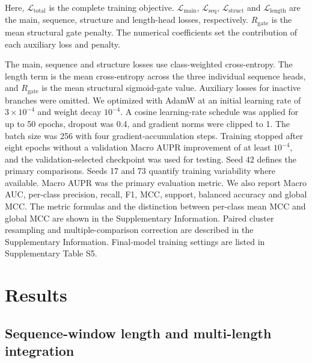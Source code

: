 \documentclass[unnumsec,webpdf,contemporary,large]{oup-authoring-template}
\begin{document}
Here, $\mathcal{L}_{\mathrm{total}}$ is the complete training objective. $\mathcal{L}_{\mathrm{main}}$, $\mathcal{L}_{\mathrm{seq}}$, $\mathcal{L}_{\mathrm{struct}}$ and $\mathcal{L}_{\mathrm{length}}$ are the main, sequence, structure and length-head losses, respectively. $R_{\mathrm{gate}}$ is the mean structural gate penalty. The numerical coefficients set the contribution of each auxiliary loss and penalty.

The main, sequence and structure losses use class-weighted cross-entropy. The length term is the mean cross-entropy across the three individual sequence heads, and $R_{\mathrm{gate}}$ is the mean structural sigmoid-gate value. Auxiliary losses for inactive branches were omitted. We optimized with AdamW at an initial learning rate of $3\times10^{-4}$ and weight decay $10^{-4}$. A cosine learning-rate schedule was applied for up to 50 epochs, dropout was 0.4, and gradient norms were clipped to 1. The batch size was 256 with four gradient-accumulation steps. Training stopped after eight epochs without a validation Macro AUPR improvement of at least $10^{-4}$, and the validation-selected checkpoint was used for testing. Seed 42 defines the primary comparisons. Seeds 17 and 73 quantify training variability where available. Macro AUPR was the primary evaluation metric. We also report Macro AUC, per-class precision, recall, F1, MCC, support, balanced accuracy and global MCC. The metric formulas and the distinction between per-class mean MCC and global MCC are shown in the Supplementary Information. Paired cluster resampling and multiple-comparison correction are described in the Supplementary Information. Final-model training settings are listed in Supplementary Table S5.

\section{Results}

\subsection{Sequence-window length and multi-length integration}
\end{document}
